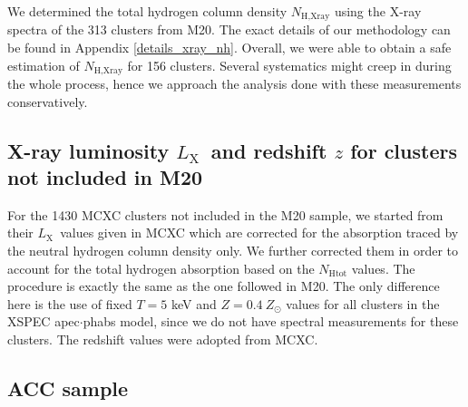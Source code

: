 \documentclass{aa}   %
\newcommand{\Lx}{$L_{\text{X}}$}
\begin{document}
We determined the total hydrogen column density $N_{\text{H,Xray}}$ using the X-ray spectra of the 313 clusters from M20. The exact details of our methodology can be found in Appendix \ref{details_xray_nh}. Overall, we were able to obtain a safe estimation of $N_{\text{H,Xray}}$ for 156 clusters. Several systematics might creep in during the whole process, hence we approach the analysis done with these measurements conservatively.

\subsection{X-ray luminosity \Lx\ and redshift $z$ for clusters not included in M20}\label{Lx_from_mcxc}

For the 1430 MCXC clusters not included in the M20 sample, we started from their \Lx\ values given in MCXC which are corrected for the absorption traced by the neutral hydrogen column density only. We further corrected them in order to account for the total hydrogen absorption based on the \citet[][hereafter W13]{willingale} $N_{\text{Htot}}$ values. The procedure is exactly the same as the one followed in M20. The only difference here is the use of fixed $T=5$ keV and $Z=0.4\ Z_{\odot}$ values for all clusters in the \textsc{XSPEC} \citep{xspec} apec$\cdot$phabs model, since we do not have spectral measurements for these clusters. The redshift values were adopted from MCXC.

\subsection{ACC sample}
\end{document}
